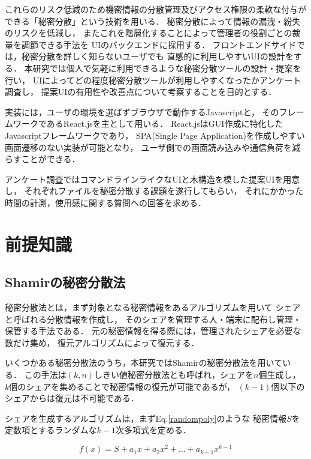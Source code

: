 \documentclass[twocolumn, fleqn, uplatex]{jsarticle}
\begin{document}
これらのリスク低減のため機密情報の分散管理及びアクセス権限の柔軟な付与が%
できる「秘密分散\cite{lit:nishikawa}」という技術を用いる．%
秘密分散によって情報の漏洩・紛失のリスクを低減し，%
またこれを階層化することによって管理者の役割ごとの裁量を調節できる手法を%
UIのバックエンドに採用する．%
フロントエンドサイドでは，秘密分散を詳しく知らないユーザでも%
直感的に利用しやすいUIの設計をする．%
本研究では個人で気軽に利用できるような秘密分散ツールの設計・提案を行い，%
UIによってどの程度秘密分散ツールが利用しやすくなったかアンケート調査し，%
提案UIの有用性や改善点について考察することを目的とする．

実装には，ユーザの環境を選ばずブラウザで動作するJavascriptと，%
そのフレームワークであるReact.jsを主として用いる．%
React.jsはGUI作成に特化したJavascriptフレームワークであり，%
SPA(Single Page Application)を作成しやすい画面遷移のない実装が可能となり，%
ユーザ側での画面読み込みや通信負荷を減らすことができる．%

アンケート調査ではコマンドラインライクなUIと木構造を模した提案UIを用意し，
それぞれファイルを秘密分散する課題を遂行してもらい，%
それにかかった時間の計測，使用感に関する質問への回答を求める．

\section{前提知識}
\subsection{Shamirの秘密分散法}
秘密分散法とは，まず対象となる秘密情報をあるアルゴリズムを用いて%
シェアと呼ばれる分散情報を作成し，%
そのシェアを管理する人・端末に配布し管理・保管する手法である．%
元の秘密情報を得る際には，管理されたシェアを必要な数だけ集め，%
復元アルゴリズムによって復元する．

いくつかある秘密分散法のうち，本研究ではShamirの秘密分散法\cite{lit:shamir}を用いている．%
この手法は$(k,n)$しきい値秘密分散法とも呼ばれ，シェアを$n$個生成し，%
$k$個のシェアを集めることで秘密情報の復元が可能であるが，%
$(k-1)$個以下のシェアからは復元は不可能である．

シェアを生成するアルゴリズムは，まずEq.\ref{randompoly}のような%
秘密情報$S$を定数項とするランダムな$k-1$次多項式を定める．

\begin{equation}
f(x) = S + a_{1}x + a_{2}x^{2} + \dots + a_{k-1}x^{k-1} \label{randompoly}
\end{equation}
\end{document}
